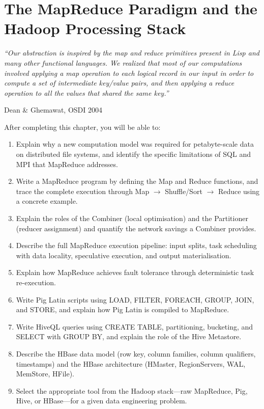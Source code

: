 
\chapter{The MapReduce Paradigm and the Hadoop Processing Stack}
\label{ch:mapreduce}

\epigraph{\textit{``Our abstraction is inspired by the map and reduce primitives present
in Lisp and many other functional languages. We realized that most of our
computations involved applying a map operation to each logical record in
our input in order to compute a set of intermediate key/value pairs, and
then applying a reduce operation to all the values that shared the same key.''}}{Dean \& Ghemawat, OSDI 2004}

\vspace{4pt}

\begin{chapterlearning}
After completing this chapter, you will be able to:
\begin{enumerate}
  \item Explain why a new computation model was required for petabyte-scale
        data on distributed file systems, and identify the specific
        limitations of SQL and MPI that MapReduce addresses.
  \item Write a MapReduce program by defining the Map and Reduce functions,
        and trace the complete execution through Map $\to$ Shuffle/Sort
        $\to$ Reduce using a concrete example.
  \item Explain the roles of the Combiner (local optimisation) and the
        Partitioner (reducer assignment) and quantify the network savings
        a Combiner provides.
  \item Describe the full MapReduce execution pipeline: input splits,
        task scheduling with data locality, speculative execution, and
        output materialisation.
  \item Explain how MapReduce achieves fault tolerance through
        deterministic task re-execution.
  \item Write Pig Latin scripts using LOAD, FILTER, FOREACH, GROUP,
        JOIN, and STORE, and explain how Pig Latin is compiled to
        MapReduce.
  \item Write HiveQL queries using CREATE TABLE, partitioning,
        bucketing, and SELECT with GROUP BY, and explain the role of
        the Hive Metastore.
  \item Describe the HBase data model (row key, column families,
        column qualifiers, timestamps) and the HBase architecture
        (HMaster, RegionServers, WAL, MemStore, HFile).
  \item Select the appropriate tool from the Hadoop stack---raw
        MapReduce, Pig, Hive, or HBase---for a given data engineering
        problem.
\end{enumerate}
\end{chapterlearning}

